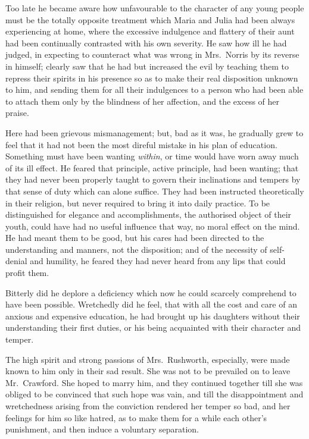 \documentclass{article}
\begin{document}
Too late he became aware how unfavourable to the character
of any young people must be the totally opposite treatment
which Maria and Julia had been always experiencing at home,
where the excessive indulgence and flattery of their aunt
had been continually contrasted with his own severity.
He saw how ill he had judged, in expecting to counteract
what was wrong in Mrs.\ Norris by its reverse in himself;
clearly saw that he had but increased the evil by teaching
them to repress their spirits in his presence so as to make
their real disposition unknown to him, and sending them
for all their indulgences to a person who had been able
to attach them only by the blindness of her affection,
and the excess of her praise.

Here had been grievous mismanagement; but, bad as it was,
he gradually grew to feel that it had not been the most
direful mistake in his plan of education.  Something must
have been wanting \emph{within}, or time would have worn
away much of its ill effect.  He feared that principle,
active principle, had been wanting; that they had never
been properly taught to govern their inclinations and
tempers by that sense of duty which can alone suffice.
They had been instructed theoretically in their religion,
but never required to bring it into daily practice.
To be distinguished for elegance and accomplishments,
the authorised object of their youth, could have had no
useful influence that way, no moral effect on the mind.
He had meant them to be good, but his cares had been directed
to the understanding and manners, not the disposition;
and of the necessity of self-denial and humility,
he feared they had never heard from any lips that could
profit them.

Bitterly did he deplore a deficiency which now he
could scarcely comprehend to have been possible.
Wretchedly did he feel, that with all the cost and care
of an anxious and expensive education, he had brought up
his daughters without their understanding their first duties,
or his being acquainted with their character and temper.

The high spirit and strong passions of Mrs.\ Rushworth,
especially, were made known to him only in their sad result.
She was not to be prevailed on to leave Mr.\ Crawford.
She hoped to marry him, and they continued together
till she was obliged to be convinced that such hope
was vain, and till the disappointment and wretchedness
arising from the conviction rendered her temper so bad,
and her feelings for him so like hatred, as to make them
for a while each other's punishment, and then induce
a voluntary separation.
\end{document}
